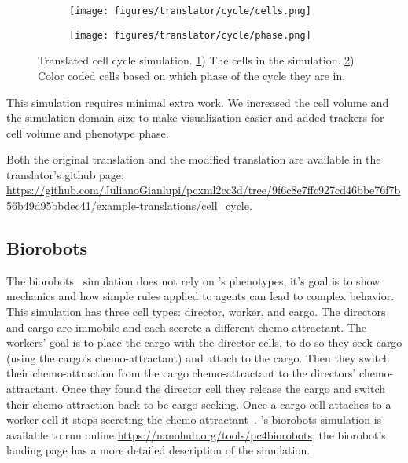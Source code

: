\begin{figure}[H]
    \centering
    \begin{subfigure}{.45\textwidth}
        \texttt{[image: figures/translator/cycle/cells.png]}
        \caption{}\label{fig:trans:cycle:1}
    \end{subfigure}
    \begin{subfigure}{.45\textwidth}
        \texttt{[image: figures/translator/cycle/phase.png]}
        \caption{}\label{fig:trans:cycle:2}
    \end{subfigure}
    \caption{Translated cell cycle simulation. \ref{fig:trans:cycle:1}) The cells in the simulation. \ref{fig:trans:cycle:2}) Color coded cells based on which phase of the cycle they are in.}
    \label{fig:trans:cycle}
\end{figure}

This simulation requires minimal extra work. We increased the cell volume and the simulation domain size to make visualization easier and added trackers for cell volume and phenotype phase.


Both the original translation and the modified translation are available in the translator's github page: \url{https://github.com/JulianoGianlupi/pcxml2cc3d/tree/9f6c8e7ffc927cd46bbe76f7b56b49d95bbdec41/example-translations/cell_cycle}.


\subsection{Biorobots}\label{sec:trans:examples:biorobots}
The biorobots~\cite{heiland_physicell_2019} simulation does not rely on \pcp's phenotypes, it's goal is to show mechanics and how simple rules applied to agents can lead to complex behavior. This simulation has three cell types: director, worker, and cargo. The directors and cargo are immobile and each secrete a different chemo-attractant. The workers' goal is to place the cargo with the director cells, to do so they seek cargo (using the cargo's chemo-attractant) and attach to the cargo. Then they switch their chemo-attraction from the cargo chemo-attractant to the directors' chemo-attractant. Once they found the director cell they release the cargo and switch their chemo-attraction back to be cargo-seeking. Once a cargo cell attaches to a worker cell it stops secreting the chemo-attractant~\cite{heiland_physicell_2019}. \pcp's biorobots simulation is available to run online \url{https://nanohub.org/tools/pc4biorobots}, the biorobot's landing page has a more detailed description of the simulation.

